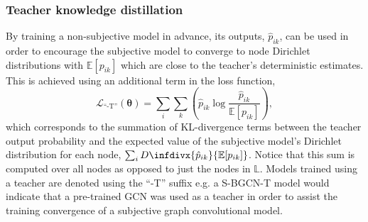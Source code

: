 \documentclass[journal]{IEEEtran}
\newcommand{\infdiv}{D\infdivx}
\begin{document}
\subsubsection{Teacher knowledge distillation}
By training a non-subjective model in advance, its outputs, $\hat{p}_{ik}$, can be used in order to encourage the subjective model to converge to node Dirichlet distributions with $\mathbb{E}[p_{ik}]$ which are close to the teacher's deterministic estimates. This is achieved using an additional term in the loss function,
\begin{equation}
    \mathcal{L}_{\text{``-T''}}(\boldsymbol{\theta})=\sum_i\sum_k\left(\hat{p}_{ik}\log\frac{\hat{p}_{ik}}{\mathbb{E}[p_{ik}]}\right),
\end{equation}
which corresponds to the summation of KL-divergence terms between the teacher output probability and the expected value of the subjective model's Dirichlet distribution for each node, $\sum_i\infdiv{\hat{p}_{ik}}{\mathbb{E}[p_{ik}]}$. Notice that this sum is computed over all nodes as opposed to just the nodes in $\mathbb{L}$. Models trained using a teacher are denoted using the ``-T'' suffix e.g. a S-BGCN-T model would indicate that a pre-trained GCN was used as a teacher in order to assist the training convergence of a subjective graph convolutional model.
\end{document}
